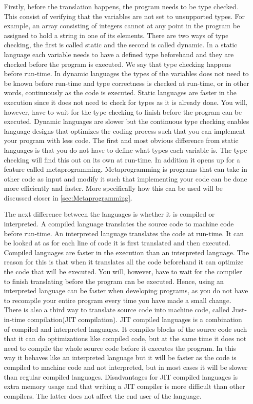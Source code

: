 Firstly, before the translation happens, the program needs to be type checked. This consist of verifying that the variables are not set to unsupported types. For example, an array consisting of integers cannot at any point in the program be assigned to hold a string in one of its elements. There are two ways of type checking, the first is called static and the second is called dynamic. In a static language each variable needs to have a defined type beforehand and they are checked before the program is executed. We say that type checking happens before run-time. In dynamic languages the types of the variables does not need to be known before run-time and type correctness is checked at run-time, or in other words, continuously as the code is executed. Static languages are faster in the execution since it does not need to check for types as it is already done. You will, however, have to wait for the type checking to finish before the program can be executed. Dynamic languages are slower but the continuous type checking enables language designs that optimizes the coding process such that you can implement your program with less code. The first and most obvious difference from static languages is that you do not have to define what types each variable is. The type checking will find this out on its own at run-time. In addition it opens up for a feature called metaprogramming. Metaprogramming is programs that can take in other code as input and modify it such that implementing your code can be done more efficiently and faster. More specifically how this can be used will be discussed closer in \autoref{sec:Metaprogramming}.

The next difference between the languages is whether it is compiled or interpreted. A compiled language translates the source code to machine code before run-time. An interpreted language translates the code at run-time. It can be looked at as for each line of code it is first translated and then executed. Compiled languages are faster in the execution than an interpreted language. The reason for this is that when it translates all the code beforehand it can optimize the code that will be executed. You will, however, have to wait for the compiler to finish translating before the program can be executed. Hence, using an interpreted language can be faster when developing programs, as you do not have to recompile your entire program every time you have made a small change. There is also a third way to translate source code into machine code, called Just-in-time compilation(JIT compilation). JIT compiled languages is a combination of compiled and interpreted languages. It compiles blocks of the source code such that it can do optimizations like compiled code, but at the same time it does not need to compile the whole source code before it executes the program. In this way it behaves like an interpreted language but it will be faster as the code is compiled to machine code and not interpreted, but in most cases it will be slower than regular compiled languages. Disadvantages for JIT compiled languages is extra memory usage and that writing a JIT compiler is more difficult than other compilers. The latter does not affect the end user of the language.

